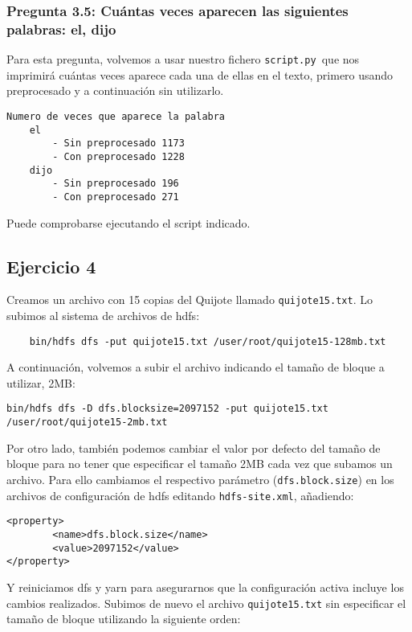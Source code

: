 \documentclass[11pt]{article}
\def\inline{\lstinline[basicstyle=\ttfamily,keywordstyle={}]}
\begin{document}
\subsubsection*{ Pregunta 3.5:  Cuántas veces aparecen las siguientes palabras: el, dijo }

Para esta pregunta, volvemos a usar nuestro fichero \inline{script.py }que nos imprimirá cuántas veces aparece cada una de ellas en el texto, primero usando preprocesado y a continuación sin utilizarlo.

\begin{verbatim}
Numero de veces que aparece la palabra
    el
        - Sin preprocesado 1173
        - Con preprocesado 1228
    dijo
        - Sin preprocesado 196
        - Con preprocesado 271
\end{verbatim}

Puede comprobarse ejecutando el script indicado.

\subsection{ Ejercicio 4 }

Creamos un archivo con 15 copias del Quijote llamado \inline{quijote15.txt}. Lo subimos al sistema de archivos de hdfs:

\begin{verbatim}
	bin/hdfs dfs -put quijote15.txt /user/root/quijote15-128mb.txt
\end{verbatim}

A continuación, volvemos a subir el archivo indicando el tamaño de bloque a utilizar, 2MB:

\begin{verbatim}
bin/hdfs dfs -D dfs.blocksize=2097152 -put quijote15.txt /user/root/quijote15-2mb.txt
\end{verbatim}

Por otro lado, también podemos cambiar el valor por defecto del tamaño de bloque para no tener que especificar el tamaño 2MB cada vez que subamos un archivo. Para ello cambiamos el respectivo parámetro (\inline{dfs.block.size}) en los archivos de configuración de hdfs editando \inline{hdfs-site.xml}, añadiendo:

\begin{verbatim}
<property>
        <name>dfs.block.size</name>
        <value>2097152</value>
</property>
\end{verbatim}

Y reiniciamos dfs y yarn para asegurarnos que la configuración activa incluye los cambios realizados. Subimos de nuevo el archivo \inline{quijote15.txt} sin especificar el tamaño de bloque utilizando la siguiente orden:
\end{document}
